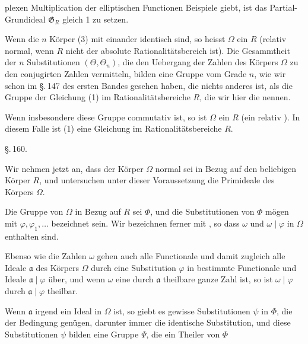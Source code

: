 plexen Multiplication der elliptischen Functionen Beispiele giebt, ist das
Partial-Grundideal $\mathfrak{G}_R$ gleich 1 zu setzen.

Wenn die $n$ Körper (3) mit einander identisch sind, so heisst $\Omega$ ein
 $R$ (relativ normal, wenn $R$ nicht der absolute
Rationalitätsbereich ist). Die Gesammtheit der $n$ Substitutionen $(\Theta, \Theta_n)$,
die den Uebergang der Zahlen des Körpers $\Omega$ zu den conjugirten Zahlen vermitteln,
bilden eine Gruppe vom Grade $n$, wie wir schon im \S.\,147 des ersten Bandes gesehen
haben, die nichts anderes ist, als die  Gruppe der Gleichung (1) im
Rationalitätsbereiche $R$, die wir hier die 
nennen.

Wenn insbesondere diese Gruppe commutativ ist, so ist $\Omega$ ein
 $R$ (ein relativ ). In diesem
Falle ist (1) eine  Gleichung im Rationalitätsbereiche $R$.

\begin{center}
\S.\,160.\\[6pt]
\end{center}

Wir nehmen jetzt an, dass der Körper $\Omega$ normal sei in Bezug auf den beliebigen
Körper $R$, und untersuchen unter dieser Voraussetzung die Primideale des Körpers
$\Omega$.

Die Gruppe von $\Omega$ in Bezug auf $R$ sei $\Phi$, und die Substitutionen von $\Phi$
mögen mit $\varphi, \varphi_1, \ldots$ bezeichnet sein. Wir bezeichnen ferner mit
, so dass $\omega$
und $\omega \mid \varphi$ in $\Omega$ enthalten sind.

Ebenso wie die Zahlen $\omega$ gehen auch alle Functionale und damit zugleich alle
Ideale $\mathfrak{a}$ des Körpers $\Omega$ durch eine Substitution $\varphi$ in bestimmte
Functionale und Ideale $\mathfrak{a} \mid \varphi$ über, und wenn $\omega$ eine durch
$\mathfrak{a}$ theilbare ganze Zahl ist, so ist $\omega \mid \varphi$ durch
$\mathfrak{a} \mid \varphi$ theilbar.

Wenn $\mathfrak{a}$ irgend ein Ideal in $\Omega$ ist, so giebt es gewisse Substitutionen
$\psi$ in $\Phi$, die der Bedingung
genügen, darunter immer die identische Substitution, und diese Substitutionen $\psi$
bilden eine Gruppe $\Psi$, die ein Theiler von $\Phi$
